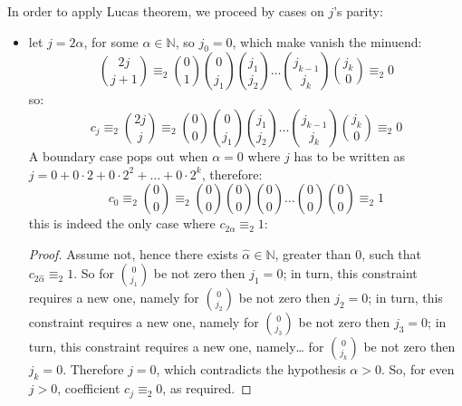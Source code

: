 In order to apply Lucas theorem, we proceed by cases on $j$'s parity:
\begin{itemize}
    \item let $j=2\alpha$, for some $\alpha\in\mathbb{N}$, so $j_{0}=0$,
        which make vanish the minuend:
        \begin{displaymath}
            {{2j}\choose{j+1}}
            \equiv_{2} {{0}\choose{1}}{{0}\choose{j_{1}}}{{j_{1}}\choose{j_{2}}}
                \ldots{{j_{k-1}}\choose{j_{k}}}{{j_{k}}\choose{0}}\equiv_{2}0
        \end{displaymath}
        so:
        \begin{displaymath}
            c_{j}\equiv_{2}{{2j}\choose{j}}
            \equiv_{2} {{0}\choose{0}}{{0}\choose{j_{1}}}{{j_{1}}\choose{j_{2}}}
                \ldots{{j_{k-1}}\choose{j_{k}}}{{j_{k}}\choose{0}}\equiv_{2}0
        \end{displaymath}
        A boundary case pops out when $\alpha=0$ where $j$ has to be written as 
        $j=0 + 0\cdot2 + 0\cdot2^{2} + \ldots + 0\cdot2^{k}$, therefore:
        \begin{displaymath}
            c_{0}\equiv_{2}{{0}\choose{0}}
            \equiv_{2} {{0}\choose{0}}{{0}\choose{0}}{{0}\choose{0}}
                \ldots{{0}\choose{0}}{{0}\choose{0}}\equiv_{2}1
        \end{displaymath}
        this is indeed the only case where $c_{2\alpha} \equiv_{2}1$:
        \begin{proof}
            Assume not, hence there exists $\hat{\alpha}\in\mathbb{N}$, greater than $0$,
            such that $c_{2\hat{\alpha}} \equiv_{2}1$. So for ${{0}\choose{j_{1}}}$
            be not zero then $j_{1}=0$; in turn, this constraint requires a new one, namely
            for ${{0}\choose{j_{2}}}$ be not zero then $j_{2}=0$; 
            in turn, this constraint requires a new one, namely
            for ${{0}\choose{j_{3}}}$ be not zero then $j_{3}=0$; 
            in turn, this constraint requires a new one, namely\ldots
            for ${{0}\choose{j_{k}}}$ be not zero then $j_{k}=0$.
            Therefore $j=0$, which contradicts the hypothesis $\alpha>0$. So,
            for even $j > 0$, coefficient $c_{j}\equiv_{2}0$, as required.
        \end{proof}


\end{itemize}
